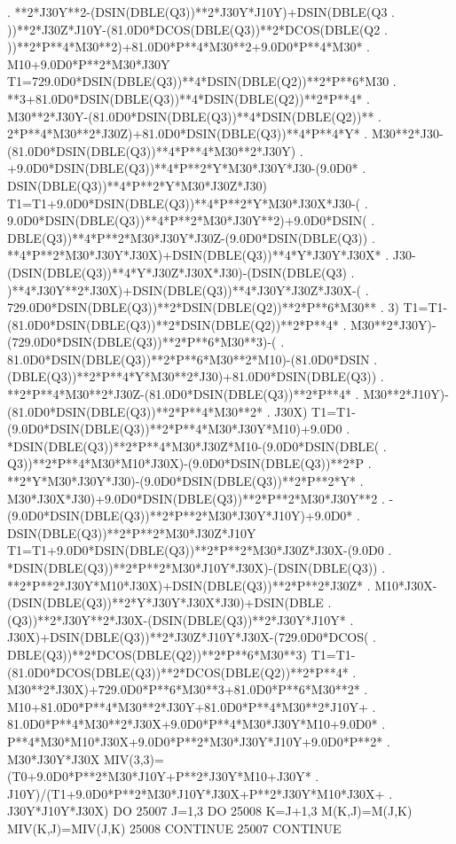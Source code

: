 \begin{framedverbatim}
     . **2*J30Y**2-(DSIN(DBLE(Q3))**2*J30Y*J10Y)+DSIN(DBLE(Q3
     . ))**2*J30Z*J10Y-(81.0D0*DCOS(DBLE(Q3))**2*DCOS(DBLE(Q2
     . ))**2*P**4*M30**2)+81.0D0*P**4*M30**2+9.0D0*P**4*M30*
     . M10+9.0D0*P**2*M30*J30Y
      T1=729.0D0*DSIN(DBLE(Q3))**4*DSIN(DBLE(Q2))**2*P**6*M30
     . **3+81.0D0*DSIN(DBLE(Q3))**4*DSIN(DBLE(Q2))**2*P**4*
     . M30**2*J30Y-(81.0D0*DSIN(DBLE(Q3))**4*DSIN(DBLE(Q2))**
     . 2*P**4*M30**2*J30Z)+81.0D0*DSIN(DBLE(Q3))**4*P**4*Y*
     . M30**2*J30-(81.0D0*DSIN(DBLE(Q3))**4*P**4*M30**2*J30Y)
     . +9.0D0*DSIN(DBLE(Q3))**4*P**2*Y*M30*J30Y*J30-(9.0D0*
     . DSIN(DBLE(Q3))**4*P**2*Y*M30*J30Z*J30)
      T1=T1+9.0D0*DSIN(DBLE(Q3))**4*P**2*Y*M30*J30X*J30-(
     . 9.0D0*DSIN(DBLE(Q3))**4*P**2*M30*J30Y**2)+9.0D0*DSIN(
     . DBLE(Q3))**4*P**2*M30*J30Y*J30Z-(9.0D0*DSIN(DBLE(Q3))
     . **4*P**2*M30*J30Y*J30X)+DSIN(DBLE(Q3))**4*Y*J30Y*J30X*
     . J30-(DSIN(DBLE(Q3))**4*Y*J30Z*J30X*J30)-(DSIN(DBLE(Q3)
     . )**4*J30Y**2*J30X)+DSIN(DBLE(Q3))**4*J30Y*J30Z*J30X-(
     . 729.0D0*DSIN(DBLE(Q3))**2*DSIN(DBLE(Q2))**2*P**6*M30**
     . 3)
      T1=T1-(81.0D0*DSIN(DBLE(Q3))**2*DSIN(DBLE(Q2))**2*P**4*
     . M30**2*J30Y)-(729.0D0*DSIN(DBLE(Q3))**2*P**6*M30**3)-(
     . 81.0D0*DSIN(DBLE(Q3))**2*P**6*M30**2*M10)-(81.0D0*DSIN
     . (DBLE(Q3))**2*P**4*Y*M30**2*J30)+81.0D0*DSIN(DBLE(Q3))
     . **2*P**4*M30**2*J30Z-(81.0D0*DSIN(DBLE(Q3))**2*P**4*
     . M30**2*J10Y)-(81.0D0*DSIN(DBLE(Q3))**2*P**4*M30**2*
     . J30X)
      T1=T1-(9.0D0*DSIN(DBLE(Q3))**2*P**4*M30*J30Y*M10)+9.0D0
     . *DSIN(DBLE(Q3))**2*P**4*M30*J30Z*M10-(9.0D0*DSIN(DBLE(
     . Q3))**2*P**4*M30*M10*J30X)-(9.0D0*DSIN(DBLE(Q3))**2*P
     . **2*Y*M30*J30Y*J30)-(9.0D0*DSIN(DBLE(Q3))**2*P**2*Y*
     . M30*J30X*J30)+9.0D0*DSIN(DBLE(Q3))**2*P**2*M30*J30Y**2
     . -(9.0D0*DSIN(DBLE(Q3))**2*P**2*M30*J30Y*J10Y)+9.0D0*
     . DSIN(DBLE(Q3))**2*P**2*M30*J30Z*J10Y
      T1=T1+9.0D0*DSIN(DBLE(Q3))**2*P**2*M30*J30Z*J30X-(9.0D0
     . *DSIN(DBLE(Q3))**2*P**2*M30*J10Y*J30X)-(DSIN(DBLE(Q3))
     . **2*P**2*J30Y*M10*J30X)+DSIN(DBLE(Q3))**2*P**2*J30Z*
     . M10*J30X-(DSIN(DBLE(Q3))**2*Y*J30Y*J30X*J30)+DSIN(DBLE
     . (Q3))**2*J30Y**2*J30X-(DSIN(DBLE(Q3))**2*J30Y*J10Y*
     . J30X)+DSIN(DBLE(Q3))**2*J30Z*J10Y*J30X-(729.0D0*DCOS(
     . DBLE(Q3))**2*DCOS(DBLE(Q2))**2*P**6*M30**3)
      T1=T1-(81.0D0*DCOS(DBLE(Q3))**2*DCOS(DBLE(Q2))**2*P**4*
     . M30**2*J30X)+729.0D0*P**6*M30**3+81.0D0*P**6*M30**2*
     . M10+81.0D0*P**4*M30**2*J30Y+81.0D0*P**4*M30**2*J10Y+
     . 81.0D0*P**4*M30**2*J30X+9.0D0*P**4*M30*J30Y*M10+9.0D0*
     . P**4*M30*M10*J30X+9.0D0*P**2*M30*J30Y*J10Y+9.0D0*P**2*
     . M30*J30Y*J30X
      MIV(3,3)=(T0+9.0D0*P**2*M30*J10Y+P**2*J30Y*M10+J30Y*
     . J10Y)/(T1+9.0D0*P**2*M30*J10Y*J30X+P**2*J30Y*M10*J30X+
     . J30Y*J10Y*J30X)
      DO 25007 J=1,3
          DO 25008 K=J+1,3
              M(K,J)=M(J,K)
              MIV(K,J)=MIV(J,K)
25008     CONTINUE
25007 CONTINUE
\end{framedverbatim}



